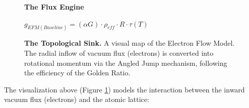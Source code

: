 \documentclass[11pt, a4paper]{article}
\begin{document}
\begin{figure}[!ht]
\centering
\vspace{1em} 
\textbf{The Flux Engine} \\ 
\vspace{0.5em}

\vspace{0.2em}
$g_{EFM(Baseline)} = (\alpha G) \cdot \rho_{eff} \cdot R \cdot \tau(T)$

\caption{\textbf{The Topological Sink.} A visual map of the Electron Flow Model. The radial inflow of vacuum flux (electrons) is converted into rotational momentum via the Angled Jump mechanism, following the efficiency of the Golden Ratio.}
\label{fig:flux_sink}
\end{figure}

The visualization above (Figure \ref{fig:flux_sink}) models the interaction between the inward vacuum flux (electrons) and the atomic lattice:
\end{document}
